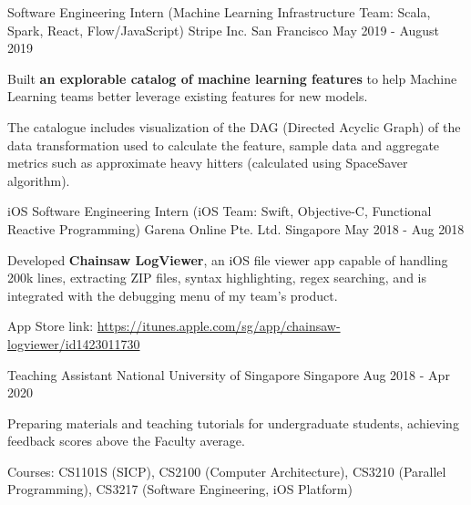 \begin{cventries}
  \cventry
  {Software Engineering Intern (Machine Learning Infrastructure Team: Scala, Spark, React, Flow/JavaScript)} %
  {Stripe Inc.} %
  {San Francisco} %
  {May 2019 - August 2019} %
  {
    \begin{cvitems}
      \item {Built \textbf{an explorable catalog of machine learning features} to help Machine Learning teams better leverage existing features for new models.}
      \item {The catalogue includes visualization of the DAG (Directed Acyclic Graph) of the data transformation used to calculate the feature, sample data and aggregate metrics such as approximate heavy hitters (calculated using SpaceSaver algorithm).}
    \end{cvitems}
  }

  \cventry
  {iOS Software Engineering Intern (iOS Team: Swift, Objective-C, Functional Reactive Programming)} %
  {Garena Online Pte. Ltd.} %
  {Singapore} %
  {May 2018 - Aug 2018} %
  {
    \begin{cvitems}
      \item {Developed \textbf{Chainsaw LogViewer}, an iOS file viewer app capable of handling 200k lines, extracting ZIP files, syntax highlighting, regex searching, and is integrated with the debugging menu of my team's product.}
      \item {App Store link: \url{https://itunes.apple.com/sg/app/chainsaw-logviewer/id1423011730}}
    \end{cvitems}
  }

  \cventry
  {Teaching Assistant} %
  {National University of Singapore} %
  {Singapore} %
  {Aug 2018 - Apr 2020} %
  {
    \begin{cvitems}
      \item {Preparing materials and teaching tutorials for undergraduate students, achieving feedback scores above the Faculty average.}
      \item {Courses: CS1101S (SICP), CS2100 (Computer Architecture), CS3210 (Parallel Programming), CS3217 (Software Engineering, iOS Platform)}
    \end{cvitems}
  }


\end{cventries}
